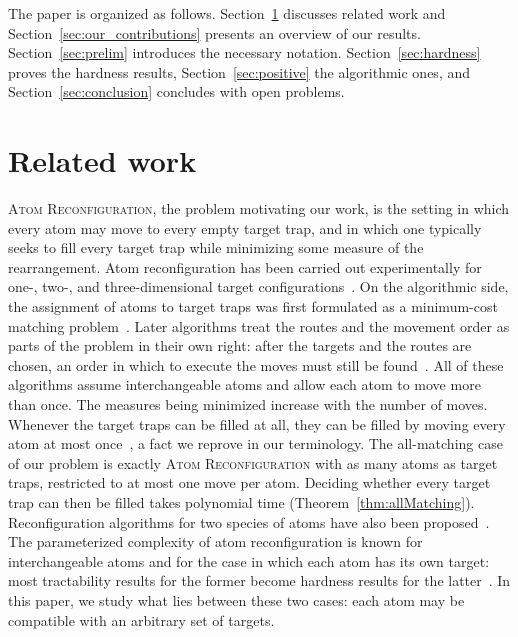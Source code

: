 \documentclass[a4paper,USenglish,thm-restate]{lipics-v2021}
\theoremstyle{problemstyle}
\begin{document}
The paper is organized as follows. Section~\ref{sec:related} discusses related
work and Section~\ref{sec:our_contributions} presents an overview of our
results. Section~\ref{sec:prelim} introduces the necessary notation.
Section~\ref{sec:hardness} proves the hardness results,
Section~\ref{sec:positive} the algorithmic ones, and
Section~\ref{sec:conclusion} concludes with open problems.

\section{Related work}
\label{sec:related}

\textsc{Atom Reconfiguration}, the problem motivating our work, is the setting
in which every atom may move to every empty target trap, and in which one
typically seeks to fill every target trap while minimizing some measure of
the rearrangement. Atom reconfiguration has been carried out
experimentally for one-, two-, and three-dimensional target
configurations~\cite{Endres2016AtomAssembly,Barredo2016AtomAssembler,%
Barredo2018Synthetic3D,OhlDeMello2019DefectFree,Schymik2020EnhancedAssembly}.
On the algorithmic side, the assignment of atoms to target traps was first
formulated as a minimum-cost matching problem~\cite{Lee2017Hungarian}. Later
algorithms treat the routes and the movement order as parts of the problem
in their own right: after the targets and the routes are chosen, an order in
which to execute the moves must still be
found~\cite{Cimring2023RedRec,ElSabeh2023ARO,Afiouni2025BirdBatching}. All
of these algorithms assume interchangeable atoms and allow each atom to
move more than once. The measures being minimized increase with the number of
moves. Whenever the target traps can be filled at all, they can be filled
by moving every atom at most
once~\cite{Calinescu2008Reconfigurations}, a fact we reprove in our
terminology. The all-matching case of our problem is exactly
\textsc{Atom Reconfiguration} with as many atoms as target traps, restricted to at most
one move per atom. Deciding whether
every target trap can then be filled takes polynomial time
(Theorem~\ref{thm:allMatching}). Reconfiguration algorithms for two species
of atoms have also been
proposed~\cite{Tao2022DualSpeciesAlgorithm,Harle2026Atommovr}. The
parameterized complexity of atom reconfiguration is known for
interchangeable atoms and for the case in which each atom has its own
target: most tractability results for the former become hardness results
for the latter~\cite{Cooper2024ParameterizedAtoms}. In this paper, we study
what lies between these two cases: each atom may be compatible with an
arbitrary set of targets.
\end{document}
